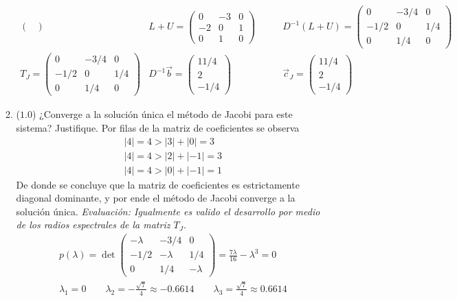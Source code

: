 \documentclass[12pt]{article}
\begin{document}
\begin{enumerate}[leftmargin=*,widest=9]
\begin{enumerate}[label=\alph*]
\begin{eqnarray*}
\begin{pmatrix}
    \end{pmatrix} \qquad &
    L+U = \begin{pmatrix}
    0 & -3 & 0 \\ -2 & 0 & 1\\ 0 & 1 & 0
    \end{pmatrix} \qquad &
    D^{-1}(L+U) = \begin{pmatrix}
    0 & -3/4 & 0 \\ -1/2 & 0 & 1/4\\ 0 & 1/4 & 0
    \end{pmatrix}\\
    T_J = \begin{pmatrix}
    0 & -3/4 & 0 \\ -1/2 & 0 & 1/4\\ 0 & 1/4 & 0
    \end{pmatrix} &
    D^{-1}\vec{b} = \begin{pmatrix}
    11/4 \\ 2\\ -1/4
    \end{pmatrix} &
    \vec{c}_J = \begin{pmatrix}
    11/4 \\ 2\\ -1/4
    \end{pmatrix}
    \end{eqnarray*}
    \item (\(1.0\)) ¿Converge a la solución única el método de Jacobi para este sistema? Justifique.
    Por filas de la matriz de coeficientes se observa
    \begin{eqnarray*}
    |4| = 4 > |3| + |0| = 3\\
    |4| = 4 > |2| + |-1| = 3\\
    |4| = 4 > |0| + |-1| = 1
    \end{eqnarray*}
    De donde se concluye que la matriz de coeficientes es estrictamente diagonal dominante, y por ende el método de Jacobi converge a la solución única.
\textit{Evaluación: Igualmente es valido el desarrollo por medio de los radios espectrales de la matriz \(T_J\).}
\begin{eqnarray*}
p(\lambda) = \det \begin{pmatrix}
    -\lambda & -3/4 & 0 \\ -1/2 & -\lambda & 1/4\\ 0 & 1/4 & -\lambda
\end{pmatrix} = \frac{7\lambda}{16}- \lambda^3 =0\\
\lambda_1 = 0 \qquad \lambda_2 = -\frac{\sqrt{7}}{4} \approx -0.6614 \qquad \lambda_3 =\frac{\sqrt{7}}{4} \approx 0.6614\\

\end{eqnarray*}
\end{enumerate}
\end{enumerate}
\end{document}
